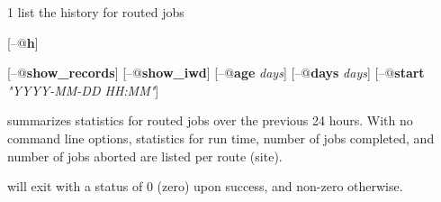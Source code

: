 \begin{ManPage}{\label{man-condor-router-history}}{1}
{list the history for routed jobs}

\Synopsis
{}
[\verb@--@\textbf{h}]

[\verb@--@\textbf{show\_records}]
[\verb@--@\textbf{show\_iwd}]
[\verb@--@\textbf{age} \textit{days}]
[\verb@--@\textbf{days} \textit{days}]
[\verb@--@\textbf{start} \textit{"YYYY-MM-DD HH:MM"}]


\Description
{} summarizes statistics for routed jobs
over the previous 24 hours.
With no command line options, statistics for run time,
number of jobs completed, and number of jobs aborted are 
listed per route (site).

\begin{Options}
\end{Options}

\ExitStatus
{} will exit with a status of 0 (zero) upon
success, and non-zero otherwise.

\end{ManPage}
